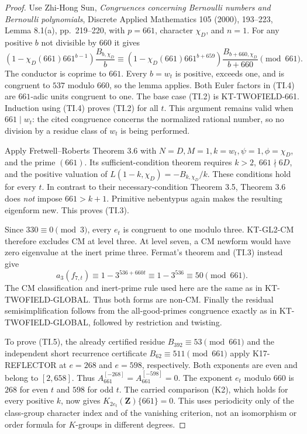 \documentclass[11pt,a4paper]{article}
\theoremstyle{definition}
\begin{document}
\begin{proof}
Use Zhi-Hong Sun, \emph{Congruences concerning Bernoulli
numbers and Bernoulli polynomials}, Discrete Applied
Mathematics 105 (2000), 193--223, Lemma 8.1(a),
pp.~219--220, with $p=661$, character $\chi_D$, and
$n=1$. For any positive $b$ not divisible by $660$ it gives
\[
 (1-\chi_D(661)661^{b-1})\frac{B_{b,\chi_D}}b
 \equiv
 (1-\chi_D(661)661^{b+659})
           \frac{B_{b+660,\chi_D}}{b+660}
                                  \pmod{661}.
                                                               \tag{TI.4}
\]
The conductor is coprime to $661$. Every $b=w_t$ is
positive, exceeds one, and is congruent to $537$ modulo
$660$, so the lemma applies. Both Euler factors in
(TI.4) are $661$-adic units congruent to one. The base
case (TI.2) is KT-TWOFIELD-661. Induction using (TI.4)
proves (TI.2) for all $t$. This argument remains valid
when $661\mid w_t$: the cited congruence concerns the
normalized rational number, so no division by a residue
class of $w_t$ is being performed.

Apply Fretwell--Roberts Theorem 3.6 with
$N=D,M=1,k=w_t,\psi=1,\phi=\chi_D$, and the prime
$(661)$. Its sufficient-condition theorem requires
$k>2$, $661\nmid6D$, and the positive valuation of
$L(1-k,\chi_D)=-B_{k,\chi_D}/k$. These conditions hold
for every $t$. In contrast to their necessary-condition
Theorem 3.5, Theorem 3.6 does \emph{not} impose
$661>k+1$. Primitive nebentypus again makes the resulting
eigenform new. This proves (TI.3).

Since $330\equiv0\pmod3$, every $e_t$ is congruent to
one modulo three. KT-GL2-CM therefore excludes CM at
level three. At level seven, a CM newform would have
zero eigenvalue at the inert prime three. Fermat's theorem
and (TI.3) instead give
\[
 a_3(f_{7,t})\equiv1-3^{536+660t}
                  \equiv1-3^{536}\equiv50\pmod{661}.
\]
The CM classification and inert-prime rule used here
are the same as in KT-TWOFIELD-GLOBAL. Thus both forms
are non-CM. Finally the residual semisimplification follows
from the all-good-primes congruence exactly as in
KT-TWOFIELD-GLOBAL, followed by restriction and twisting.

To prove (TI.5), the already certified residue
$B_{392}\equiv53\pmod{661}$ and the independent short
recurrence certificate $B_{62}\equiv511\pmod{661}$
apply K17-REFLECTOR at $e=268$ and $e=598$, respectively.
Both exponents are even and belong to $[2,658]$.
Thus $A_{661}^{[-268]}=A_{661}^{[-598]}=0$.
The exponent $e_t$ modulo $660$ is $268$ for even $t$
and $598$ for odd $t$. The carried comparison (K2),
which holds for every positive $k$, now gives
$K_{2e_t}(\mathbf Z)\{661\}=0$. This uses periodicity
only of the class-group character index and of the
vanishing criterion, not an isomorphism or order formula
for $K$-groups in different degrees.
\end{proof}
\end{document}
